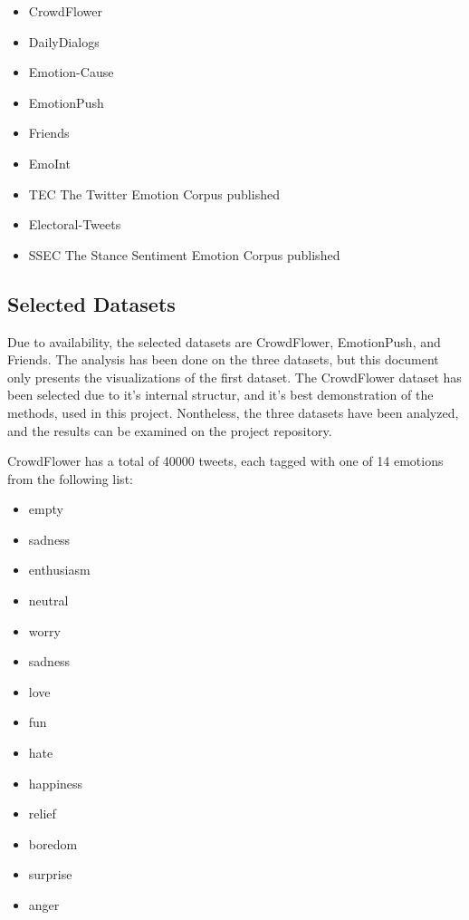 \begin{itemize}
  \item CrowdFlower %
  \item DailyDialogs~\cite{li2017dailydialog} %
  \item Emotion-Cause~\cite{ghazi2015detecting} %
  \item EmotionPush~\cite{huang2018emotionpush} %
  \item Friends~\cite{chen2018emotionlines} %
  \item EmoInt~\cite{MohammadB17starsem} %
  \item TEC The Twitter Emotion Corpus published~\cite{mohammad2012emotional} %
  \item Electoral-Tweets~\cite{mohammad2014semantic} %
  \item SSEC The Stance Sentiment Emotion Corpus published~\cite{schuff2017annotation} %
\end{itemize}

\subsection{Selected Datasets}\label{sub:Selected Datasets}
Due to availability, the selected datasets are CrowdFlower, EmotionPush, and Friends. The analysis has been done on the three datasets, but this document only presents the visualizations of the first dataset. The CrowdFlower dataset has been selected due to it's internal structur, and it's best demonstration of the methods, used in this project. Nontheless, the three datasets have been analyzed, and the results can be examined on the project repository.

CrowdFlower has a total of 40000 tweets, each tagged with one of 14 emotions from the following list:

\begin{itemize}
  \item empty
  \item sadness
  \item enthusiasm
  \item neutral
  \item worry
  \item sadness
  \item love
  \item fun
  \item hate
  \item happiness
  \item relief
  \item boredom
  \item surprise
  \item anger
\end{itemize}


